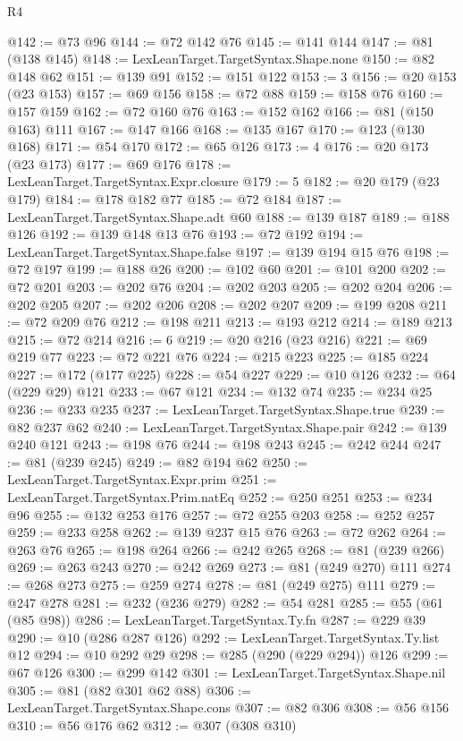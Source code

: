 \begin{lexlean}{R4}
\begin{coremodule}
@142 := @73 @96
@144 := @72 @142 @76
@145 := @141 @144
@147 := @81 (@138 @145)
@148 := LexLeanTarget.TargetSyntax.Shape.none
@150 := @82 @148 @62
@151 := @139 @91
@152 := @151 @122
@153 := 3
@156 := @20 @153 (@23 @153)
@157 := @69 @156
@158 := @72 @88
@159 := @158 @76
@160 := @157 @159
@162 := @72 @160 @76
@163 := @152 @162
@166 := @81 (@150 @163) @111
@167 := @147 @166
@168 := @135 @167
@170 := @123 (@130 @168)
@171 := @54 @170
@172 := @65 @126
@173 := 4
@176 := @20 @173 (@23 @173)
@177 := @69 @176
@178 := LexLeanTarget.TargetSyntax.Expr.closure
@179 := 5
@182 := @20 @179 (@23 @179)
@184 := @178 @182 @77
@185 := @72 @184
@187 := LexLeanTarget.TargetSyntax.Shape.adt @60
@188 := @139 @187
@189 := @188 @126
@192 := @139 @148 @13 @76
@193 := @72 @192
@194 := LexLeanTarget.TargetSyntax.Shape.false
@197 := @139 @194 @15 @76
@198 := @72 @197
@199 := @188 @26
@200 := @102 @60
@201 := @101 @200
@202 := @72 @201
@203 := @202 @76
@204 := @202 @203
@205 := @202 @204
@206 := @202 @205
@207 := @202 @206
@208 := @202 @207
@209 := @199 @208
@211 := @72 @209 @76
@212 := @198 @211
@213 := @193 @212
@214 := @189 @213
@215 := @72 @214
@216 := 6
@219 := @20 @216 (@23 @216)
@221 := @69 @219 @77
@223 := @72 @221 @76
@224 := @215 @223
@225 := @185 @224
@227 := @172 (@177 @225)
@228 := @54 @227
@229 := @10 @126
@232 := @64 (@229 @29) @121
@233 := @67 @121
@234 := @132 @74
@235 := @234 @25
@236 := @233 @235
@237 := LexLeanTarget.TargetSyntax.Shape.true
@239 := @82 @237 @62
@240 := LexLeanTarget.TargetSyntax.Shape.pair
@242 := @139 @240 @121
@243 := @198 @76
@244 := @198 @243
@245 := @242 @244
@247 := @81 (@239 @245)
@249 := @82 @194 @62
@250 := LexLeanTarget.TargetSyntax.Expr.prim
@251 := LexLeanTarget.TargetSyntax.Prim.natEq
@252 := @250 @251
@253 := @234 @96
@255 := @132 @253 @176
@257 := @72 @255 @203
@258 := @252 @257
@259 := @233 @258
@262 := @139 @237 @15 @76
@263 := @72 @262
@264 := @263 @76
@265 := @198 @264
@266 := @242 @265
@268 := @81 (@239 @266)
@269 := @263 @243
@270 := @242 @269
@273 := @81 (@249 @270) @111
@274 := @268 @273
@275 := @259 @274
@278 := @81 (@249 @275) @111
@279 := @247 @278
@281 := @232 (@236 @279)
@282 := @54 @281
@285 := @55 (@61 (@85 @98))
@286 := LexLeanTarget.TargetSyntax.Ty.fn
@287 := @229 @39
@290 := @10 (@286 @287 @126)
@292 := LexLeanTarget.TargetSyntax.Ty.list @12
@294 := @10 @292 @29
@298 := @285 (@290 (@229 @294)) @126
@299 := @67 @126
@300 := @299 @142
@301 := LexLeanTarget.TargetSyntax.Shape.nil
@305 := @81 (@82 @301 @62 @88)
@306 := LexLeanTarget.TargetSyntax.Shape.cons
@307 := @82 @306
@308 := @56 @156
@310 := @56 @176 @62
@312 := @307 (@308 @310)

\end{coremodule}
\end{lexlean}
